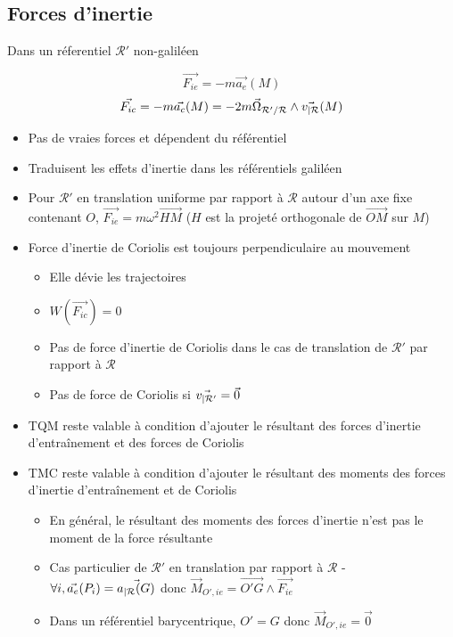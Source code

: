 \documentclass[openany]{book}
\begin{document}
\subsection{Forces d'inertie}
Dans un réferentiel $\mathcal{R}'$ non-galiléen

\[ \vec{F_{ie}} = -m \vec{a_e} (M) \]
\[ \vec{F_{ic}} = -m \vec{a_c} (M) = -2m \vec{\Omega}_{\mathcal{R'}/\mathcal{R}}\wedge \vec{v_{|\mathcal{R}}}(M) \]

\begin{itemize}
    \item Pas de vraies forces et dépendent du référentiel
    \item Traduisent les effets d'inertie dans les référentiels galiléen
    \item Pour $\mathcal{R}'$ en translation uniforme par rapport à $\mathcal{R}$ autour d'un axe fixe contenant $O$, $\vec{F_{ie}} = m \omega^2 \overrightarrow{HM}$ ($H$ est la projeté orthogonale de $\overrightarrow{OM}$ sur $M$)
    \item Force d'inertie de Coriolis est toujours perpendiculaire au mouvement 
    \begin{itemize}
        \item Elle dévie les trajectoires
        \item $W(\vec{F_{ic}}) = 0$
        \item Pas de force d'inertie de Coriolis dans le cas de translation de $\mathcal{R}'$ par rapport à $\mathcal{R}$
        \item Pas de force de Coriolis si $\vec{v_{|\mathcal{R} '}} = \vec{0}$
    \end{itemize}
    \item TQM reste valable à condition d'ajouter le résultant des forces d'inertie d'entraînement et des forces de Coriolis
    \item TMC reste valable à condition d'ajouter le résultant des moments des forces d'inertie d'entraînement et de Coriolis
    \begin{itemize}
        \item En général, le résultant des moments des forces d'inertie n'est pas le moment de la force résultante
        \item Cas particulier de $\mathcal{R}'$ en translation par rapport à $\mathcal{R}$ - $\forall i, \vec{a_e}(P_i) = \vec{a_{|\mathcal{R}}(G)}$ donc $\vec{M}_{O', ie} = \overrightarrow{O'G}\wedge \vec{F_{ie}}$
        \item Dans un référentiel barycentrique, $O' = G$ donc $\vec{M}_{O', ie} = \vec{0}$
    \end{itemize}
\end{itemize}
\end{document}
